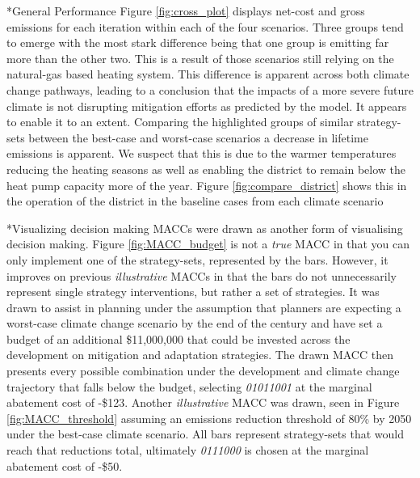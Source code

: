 \documentclass[twocolumn, a4paper,10pt]{article}
\makeatletter
\renewcommand\subsection{\@startsection{subsection}{1}{\z@}{\z@}{\z@}{\normalfont\normalsize\bfseries}}
\renewcommand\subsection{\@startsection{subsection}{1}{\z@}{\z@}{0.1pt}{\normalfont\normalsize\bfseries}}
\makeatother
\begin{document}
\subsection*{General Performance}
Figure \ref{fig:cross_plot} displays net-cost and gross emissions for each iteration within each of the four scenarios. Three groups tend to emerge with the most stark difference being that one group is emitting far more than the other two. This is a result of those scenarios still relying on the natural-gas based heating system. This difference is apparent across both climate change pathways, leading to a conclusion that the impacts of a more severe future climate is not disrupting mitigation efforts as predicted by the model. It appears to enable it to an extent. Comparing the highlighted groups of similar strategy-sets between the best-case and worst-case scenarios a decrease in lifetime emissions is apparent. We suspect that this is due to the warmer temperatures reducing the heating seasons as well as enabling the district to remain below the heat pump capacity more of the year. Figure \ref{fig:compare_district} shows this in the operation of the district in the baseline cases from each climate scenario

\subsection*{Visualizing decision making}
MACCs were drawn as another form of visualising decision making. Figure \ref{fig:MACC_budget} is not a \textit{true} MACC in that you can only implement one of the strategy-sets, represented by the bars. However, it improves on previous \textit{illustrative} MACCs in that the bars do not unnecessarily represent single strategy interventions, but rather a set of strategies. It was drawn to assist in planning under the assumption that planners are expecting a worst-case climate change scenario by the end of the century and have set a budget of an additional \$11,000,000 that could be invested across the development on mitigation and adaptation strategies. The drawn MACC then presents every possible combination under the development and climate change trajectory that falls below the budget, selecting \textit{01011001} at the marginal abatement cost of -\$123. Another \textit{illustrative} MACC was drawn, seen in Figure \ref{fig:MACC_threshold} assuming an emissions reduction threshold of 80\% by 2050 under the best-case climate scenario. All bars represent strategy-sets that would reach that reductions total, ultimately \textit{0111000} is chosen at the marginal abatement cost of -\$50.
\end{document}
